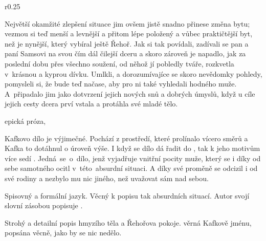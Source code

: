 \documentclass{extarticle} %
\begin{document}

\changefontsize{8pt}


\noindent\begin{wrapfigure}{r}{0.25\textwidth}
\tiny

\setlength{\parindent}{3pt}
Největší okamžité zlepšení situace jim ovšem jistě snadno přinese změna bytu;
vezmou si teď menší a levnější a přitom lépe položený a vůbec praktičtější byt,
než je nynější, který vybíral ještě Řehoř.
Jak si tak povídali, zadívali se pan a paní Samsovi na svou čím dál čilejší dceru
a skoro zároveň je napadlo, jak za poslední dobu přes všechno soužení,
od něhož jí pobledly tváře, rozkvetla v~krásnou a kyprou dívku.
Umlkli, a dorozumívajíce se skoro nevědomky pohledy, pomysleli si,
že bude teď načase, aby pro ni také vyhledali hodného muže.
A~připadalo jim jako dotvrzení jejich nových snů a dobrých úmyslů,
když u cíle jejich cesty dcera prví vstala a protáhla své mladé tělo.
\end{wrapfigure}


\noindent epická próza, 

\noindent Kafkovo dílo je výjimečné.
Pochází z prostředí, které prolínalo vícero směrů a Kafka to dotáhnul o úroveň výše.
I když se dílo dá řadit do , tak k jeho motivům více sedí .
Jedná~se~o~dílo, jenž vyjadřuje vnitřní pocity muže,
který se i díky  od sebe samotného ocitl v~této~absurdní situaci.
A díky své proměně se odcizil i od své rodiny a nezbylo mu nic jiného, než uvažovat sám nad sebou.

\noindent Spisovný a formální jazyk.
Věcný k popisu tak absurdních situací.
Autor svojí slovní zásobou popisuje .



\noindent Strohý a detailní popis hmyzího těla a Řehořova pokoje.
 věrná Kafkově jménu, popsána věcně, jako by se nic nedělo.
\end{document}
